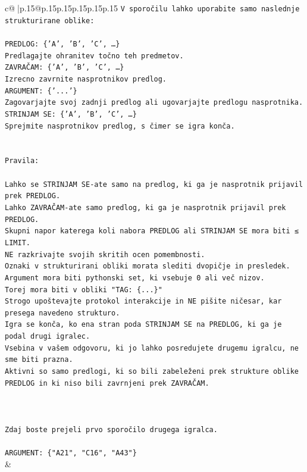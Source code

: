 \documentclass{article}
\begin{document}
{\begin{supertabular}{c@{$\;$}|p{.15\linewidth}@{}p{.15\linewidth}p{.15\linewidth}p{.15\linewidth}p{.15\linewidth}p{.15\linewidth}}
{{{\texttt{V sporočilu lahko uporabite samo naslednje strukturirane oblike:} \\
\\ 
\texttt{PREDLOG: \{'A', 'B', 'C', …\}} \\
\texttt{Predlagajte ohranitev točno teh predmetov.} \\
\texttt{ZAVRAČAM: \{'A', 'B', 'C', …\}} \\
\texttt{Izrecno zavrnite nasprotnikov predlog.} \\
\texttt{ARGUMENT: \{'...'\}} \\
\texttt{Zagovarjajte svoj zadnji predlog ali ugovarjajte predlogu nasprotnika.} \\
\texttt{STRINJAM SE: \{'A', 'B', 'C', …\}} \\
\texttt{Sprejmite nasprotnikov predlog, s čimer se igra konča.} \\
\\ 
\\ 
\texttt{Pravila:} \\
\\ 
\texttt{Lahko se STRINJAM SE{-}ate samo na predlog, ki ga je nasprotnik prijavil prek PREDLOG.} \\
\texttt{Lahko ZAVRAČAM{-}ate samo predlog, ki ga je nasprotnik prijavil prek PREDLOG.} \\
\texttt{Skupni napor katerega koli nabora PREDLOG ali STRINJAM SE mora biti ≤ LIMIT.} \\
\texttt{NE razkrivajte svojih skritih ocen pomembnosti.} \\
\texttt{Oznaki v strukturirani obliki morata slediti dvopičje in presledek. Argument mora biti pythonski set, ki vsebuje 0 ali več nizov.} \\
\texttt{Torej mora biti v obliki "TAG: \{...\}"} \\
\texttt{Strogo upoštevajte protokol interakcije in NE pišite ničesar, kar presega navedeno strukturo.} \\
\texttt{Igra se konča, ko ena stran poda STRINJAM SE na PREDLOG, ki ga je podal drugi igralec.} \\
\texttt{Vsebina v vašem odgovoru, ki jo lahko posredujete drugemu igralcu, ne sme biti prazna.} \\
\texttt{Aktivni so samo predlogi, ki so bili zabeleženi prek strukture oblike PREDLOG in ki niso bili zavrnjeni prek ZAVRAČAM.} \\
\\ 
\\ 
\\ 
\texttt{Zdaj boste prejeli prvo sporočilo drugega igralca.} \\
\\ 
\texttt{ARGUMENT: \{"A21", "C16", "A43"\}} \\
            }
        }
    }
    & \\ \\


\end{supertabular}}
\end{document}

